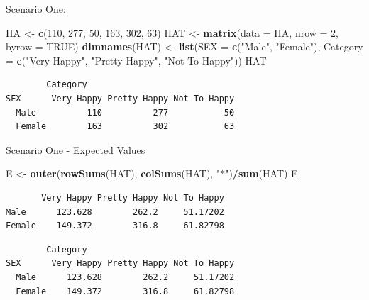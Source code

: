 \documentclass[
  ignorenonframetext,
]{beamer}
\newenvironment{Shaded}{\begin{snugshade}}{\end{snugshade}}
\newcommand{\AttributeTok}[1]{\textcolor[rgb]{0.13,0.29,0.53}{#1}}
\newcommand{\CommentTok}[1]{\textcolor[rgb]{0.56,0.35,0.01}{\textit{#1}}}
\newcommand{\ConstantTok}[1]{\textcolor[rgb]{0.56,0.35,0.01}{#1}}
\newcommand{\DecValTok}[1]{\textcolor[rgb]{0.00,0.00,0.81}{#1}}
\newcommand{\FunctionTok}[1]{\textcolor[rgb]{0.13,0.29,0.53}{\textbf{#1}}}
\newcommand{\NormalTok}[1]{#1}
\newcommand{\OtherTok}[1]{\textcolor[rgb]{0.56,0.35,0.01}{#1}}
\newcommand{\SpecialCharTok}[1]{\textcolor[rgb]{0.81,0.36,0.00}{\textbf{#1}}}
\newcommand{\StringTok}[1]{\textcolor[rgb]{0.31,0.60,0.02}{#1}}
\begin{document}
\begin{frame}[fragile]{Scenario One:}
\protect\hypertarget{scenario-one-1}{}
\begin{Shaded}
\begin{Highlighting}[]
\NormalTok{HA }\OtherTok{\textless{}{-}} \FunctionTok{c}\NormalTok{(}\DecValTok{110}\NormalTok{, }\DecValTok{277}\NormalTok{, }\DecValTok{50}\NormalTok{, }\DecValTok{163}\NormalTok{, }\DecValTok{302}\NormalTok{, }\DecValTok{63}\NormalTok{)}
\NormalTok{HAT }\OtherTok{\textless{}{-}} \FunctionTok{matrix}\NormalTok{(}\AttributeTok{data =}\NormalTok{ HA, }\AttributeTok{nrow =} \DecValTok{2}\NormalTok{, }\AttributeTok{byrow =} \ConstantTok{TRUE}\NormalTok{)}
\FunctionTok{dimnames}\NormalTok{(HAT) }\OtherTok{\textless{}{-}} \FunctionTok{list}\NormalTok{(}\AttributeTok{SEX =} \FunctionTok{c}\NormalTok{(}\StringTok{"Male"}\NormalTok{, }\StringTok{"Female"}\NormalTok{),}
 \AttributeTok{Category =} \FunctionTok{c}\NormalTok{(}\StringTok{"Very Happy"}\NormalTok{, }\StringTok{"Pretty Happy"}\NormalTok{, }\StringTok{"Not To Happy"}\NormalTok{))}
\NormalTok{HAT}
\end{Highlighting}
\end{Shaded}

\begin{verbatim}
        Category
SEX      Very Happy Pretty Happy Not To Happy
  Male          110          277           50
  Female        163          302           63
\end{verbatim}
\end{frame}

\begin{frame}[fragile]{Scenario One - Expected Values}
\protect\hypertarget{scenario-one---expected-values}{}
\begin{Shaded}
\begin{Highlighting}[]
\NormalTok{E }\OtherTok{\textless{}{-}} \FunctionTok{outer}\NormalTok{(}\FunctionTok{rowSums}\NormalTok{(HAT), }\FunctionTok{colSums}\NormalTok{(HAT), }\StringTok{"*"}\NormalTok{)}\SpecialCharTok{/}\FunctionTok{sum}\NormalTok{(HAT)}
\NormalTok{E}
\end{Highlighting}
\end{Shaded}

\begin{verbatim}
       Very Happy Pretty Happy Not To Happy
Male      123.628        262.2     51.17202
Female    149.372        316.8     61.82798
\end{verbatim}

\begin{Shaded}
\end{Shaded}

\begin{verbatim}
        Category
SEX      Very Happy Pretty Happy Not To Happy
  Male      123.628        262.2     51.17202
  Female    149.372        316.8     61.82798
\end{verbatim}
\end{frame}
\end{document}
